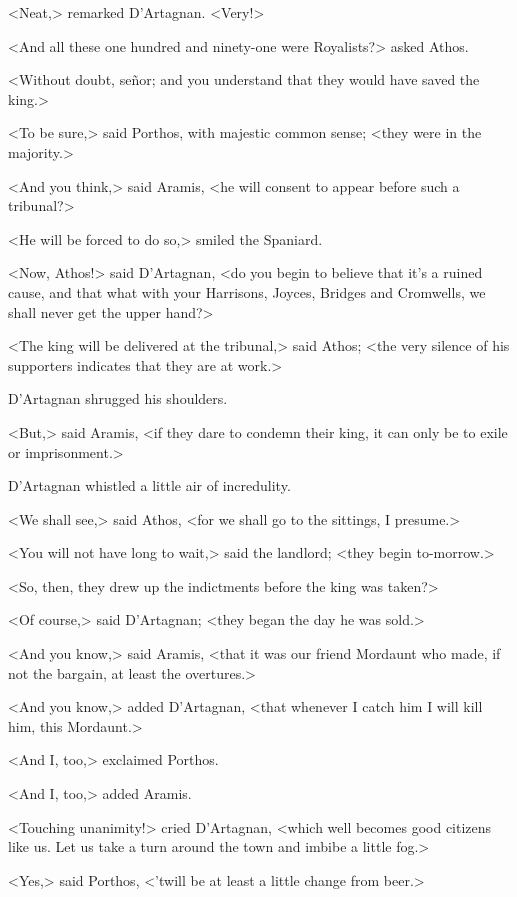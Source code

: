 <Neat,> remarked D'Artagnan. <Very!>

<And all these one hundred and ninety-one were Royalists?> asked Athos.

<Without doubt, señor; and you understand that they would have saved the king.>

<To be sure,> said Porthos, with majestic common sense; <they were in the majority.>

<And you think,> said Aramis, <he will consent to appear before such a tribunal?>

<He will be forced to do so,> smiled the Spaniard.

<Now, Athos!> said D'Artagnan, <do you begin to believe that it's a ruined cause, and that what with your Harrisons, Joyces, Bridges and Cromwells, we shall never get the upper hand?>

<The king will be delivered at the tribunal,> said Athos; <the very silence of his supporters indicates that they are at work.>

D'Artagnan shrugged his shoulders.

<But,> said Aramis, <if they dare to condemn their king, it can only be to exile or imprisonment.>

D'Artagnan whistled a little air of incredulity.

<We shall see,> said Athos, <for we shall go to the sittings, I presume.>

<You will not have long to wait,> said the landlord; <they begin to-morrow.>

<So, then, they drew up the indictments before the king was taken?>

<Of course,> said D'Artagnan; <they began the day he was sold.>

<And you know,> said Aramis, <that it was our friend Mordaunt who made, if not the bargain, at least the overtures.>

<And you know,> added D'Artagnan, <that whenever I catch him I will kill him, this Mordaunt.>

<And I, too,> exclaimed Porthos.

<And I, too,> added Aramis.

<Touching unanimity!> cried D'Artagnan, <which well becomes good citizens like us. Let us take a turn around the town and imbibe a little fog.>

<Yes,> said Porthos, <'twill be at least a little change from beer.> 